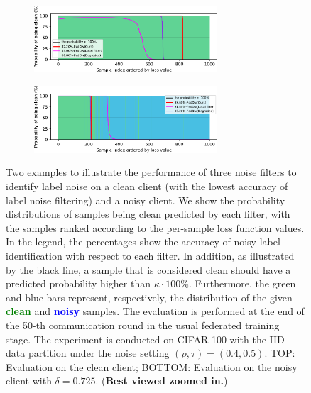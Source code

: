 \documentclass[letterpaper]{article} %
\begin{document}
\begin{figure}[t]
    \centering
    \begin{subfigure}{\textwidth}
        \centering
        \includegraphics[width=0.75\textwidth]{figures/identification_performance_clean.pdf}
    \end{subfigure}
    \begin{subfigure}{\textwidth}
        \centering
        \includegraphics[width=0.75\textwidth]{figures/identification_performance_noisy.pdf}
    \end{subfigure}

    \caption{Two examples to illustrate the performance of three noise filters to identify label noise on a clean client (with the lowest accuracy of label noise filtering) and a noisy client. We show the probability distributions of samples being clean predicted by each filter, with the samples ranked according to the per-sample loss function values. In the legend, the percentages show the accuracy of noisy label identification with respect to each filter. In addition, as illustrated by the black line, a sample that is considered clean should have a predicted probability higher than $\kappa\cdot100\%$. Furthermore, the green and blue bars represent, respectively, the distribution of the given \textbf{\textcolor{green}{clean}} and \textbf{\textcolor{blue}{noisy}} samples. The evaluation is performed at the end of the 50-th communication round in the usual federated training stage. The experiment is conducted on CIFAR-100 with the IID data partition under the noise setting $(\rho, \tau)=(0.4, 0.5)$. TOP: Evaluation on the clean client; BOTTOM: Evaluation on the noisy client with $\delta=0.725$. (\textbf{Best viewed zoomed in.})}
    \label{Figure:Performance-On-Different-Filter}
\end{figure}
 
\end{document}
